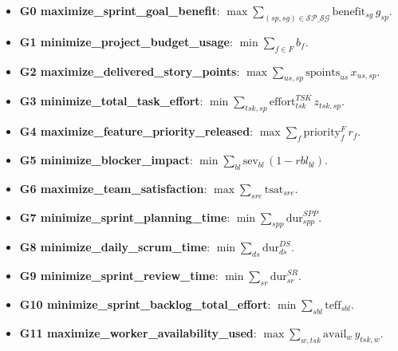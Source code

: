 \documentclass[11pt,a4paper]{article}
\begin{document}
\begin{itemize}
  \item \textbf{G0 maximize\_sprint\_goal\_benefit}: $\max \sum_{(sp,sg)\in \mathcal{SP\_SG}} \text{benefit}_{sg}\, g_{sp}$.
  \item \textbf{G1 minimize\_project\_budget\_usage}: $\min \sum_{f\in F} b_f$.
  \item \textbf{G2 maximize\_delivered\_story\_points}: $\max \sum_{us,sp} \text{spoints}_{us}\, x_{us,sp}$.
  \item \textbf{G3 minimize\_total\_task\_effort}: $\min \sum_{tsk,sp} \text{effort}^{TSK}_{tsk}\, z_{tsk,sp}$.
  \item \textbf{G4 maximize\_feature\_priority\_released}: $\max \sum_{f} \text{priority}^F_f\, r_f$.
  \item \textbf{G5 minimize\_blocker\_impact}: $\min \sum_{bl} \text{sev}_{bl}\,(1-rbl_{bl})$.
  \item \textbf{G6 maximize\_team\_satisfaction}: $\max \sum_{sre} \text{tsat}_{sre}$.
  \item \textbf{G7 minimize\_sprint\_planning\_time}: $\min \sum_{spp} \text{dur}^{SPP}_{spp}$.
  \item \textbf{G8 minimize\_daily\_scrum\_time}: $\min \sum_{ds} \text{dur}^{DS}_{ds}$.
  \item \textbf{G9 minimize\_sprint\_review\_time}: $\min \sum_{sr} \text{dur}^{SR}_{sr}$.
  \item \textbf{G10 minimize\_sprint\_backlog\_total\_effort}: $\min \sum_{sbl} \text{teff}_{sbl}$.
  \item \textbf{G11 maximize\_worker\_availability\_used}: $\max \sum_{w,tsk} \text{avail}_w\, y_{tsk,w}$.
\end{itemize}
\end{document}
